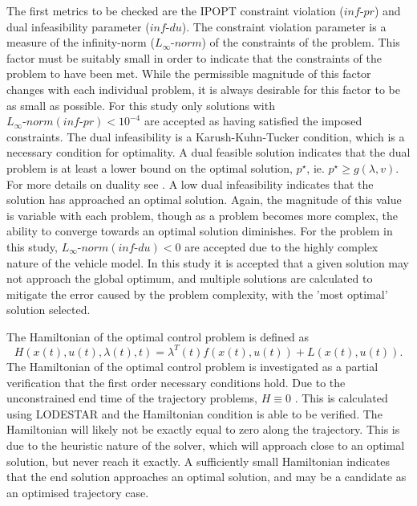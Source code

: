 The first metrics to be checked are the IPOPT constraint violation ($inf\textrm{-}pr$) and dual infeasibility parameter ($inf\textrm{-}du$)\cite{Kawajir2010}. The constraint violation parameter is a measure of the infinity-norm ($L_\infty\textrm{-}norm$) of the constraints of the problem\cite{Kawajir2010}. This factor must be suitably small in order to indicate that the constraints of the problem to have been met. While the permissible magnitude of this factor changes with each individual problem, it is always desirable for this factor to be as small as possible. For this study only solutions with $L_\infty\textrm{-}norm(inf\textrm{-}pr) < 10^{-4} $ are accepted as having satisfied the imposed constraints. The dual infeasibility is a Karush-Kuhn-Tucker condition\cite{Hindi2006}, which is a necessary condition for optimality. A dual feasible solution indicates that the dual problem is at least a lower bound on the optimal solution, $p^\star$, ie. $p^\star \geq g(\lambda,v)$. For more details on duality see \cite{Hindi2006}.
A low dual infeasibility indicates that the solution has approached an optimal solution. Again, the magnitude of this value is variable with each problem, though as a problem becomes more complex, the ability to converge towards an optimal solution diminishes. For the problem in this study, $L_\infty\textrm{-}norm(inf\textrm{-}du) < 0 $ are accepted due to the highly complex nature of the vehicle model. In this study it is accepted that a given solution may not approach the global optimum, and multiple solutions are calculated to mitigate the error caused by the problem complexity, with the 'most optimal' solution selected. 


The Hamiltonian of the optimal control problem is defined as 
\begin{equation}
H(x(t),u(t),\lambda(t),t) = \lambda^T(t)f(x(t),u(t)) + L(x(t),u(t)).
\end{equation}
The Hamiltonian of the optimal control problem is investigated as a partial verification that the first order necessary conditions hold. Due to the unconstrained end time of the trajectory problems, $H\equiv 0 $ \cite{Pucci2007}. 
This is calculated using LODESTAR and the Hamiltonian condition is able to be verified. The Hamiltonian will likely not be exactly equal to zero along the trajectory. This is due to the heuristic nature of the solver, which will approach close to an optimal solution, but never reach it exactly. A sufficiently small Hamiltonian indicates that the end solution approaches an optimal solution, and may be a candidate as an optimised trajectory case. 


